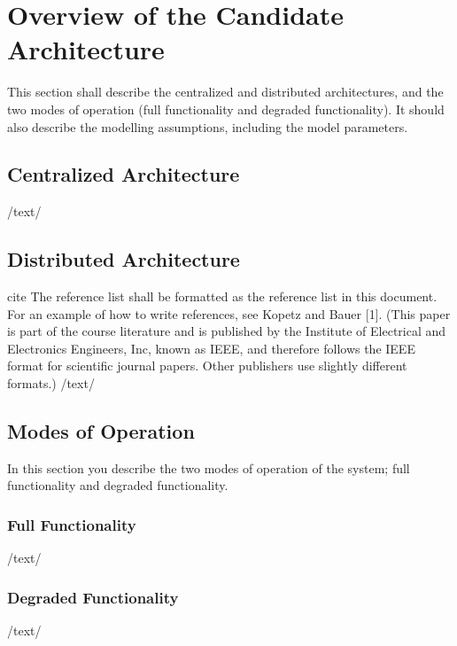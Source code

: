 
\newpage
\section{Overview of the Candidate Architecture}
{This section shall describe the centralized and distributed architectures, and the two modes of operation (full functionality and degraded functionality). It should also describe the modelling assumptions, including the model parameters.} 
\subsection{Centralized Architecture}
/text/
\subsection{Distributed Architecture}
cite The reference list shall be formatted as the reference list in this document. For an example of how to write references, see Kopetz and Bauer [1]. (This paper is part of the course literature and is published by the Institute of Electrical and Electronics Engineers, Inc, known as IEEE, and therefore follows the IEEE format for scientific journal papers. Other publishers use slightly different formats.)\cite{lamport94}
/text/
\subsection{Modes of Operation}
In this section you describe the two modes of operation of the system; full functionality and degraded functionality.
\subsubsection{Full Functionality}
/text/
\subsubsection{Degraded Functionality}
/text/
